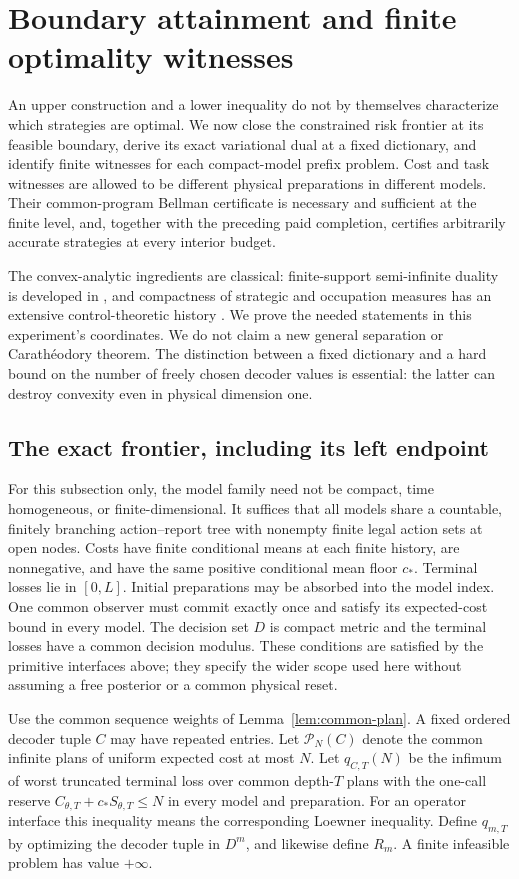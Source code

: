 \section{Boundary attainment and finite optimality witnesses}\label{sec:primal-dual}
An upper construction and a lower inequality do not by themselves characterize which strategies are optimal. We now close the constrained risk frontier at its feasible boundary, derive its exact variational dual at a fixed dictionary, and identify finite witnesses for each compact-model prefix problem. Cost and task witnesses are allowed to be different physical preparations in different models. Their common-program Bellman certificate is necessary and sufficient at the finite level, and, together with the preceding paid completion, certifies arbitrarily accurate strategies at every interior budget.

The convex-analytic ingredients are classical: finite-support semi-infinite duality is developed in \cite{Charnes63,Shapiro09}, and compactness of strategic and occupation measures has an extensive control-theoretic history \cite{Balder89,Dufour25}. We prove the needed statements in this experiment's coordinates. We do not claim a new general separation or Carath\'eodory theorem. The distinction between a fixed dictionary and a hard bound on the number of freely chosen decoder values is essential: the latter can destroy convexity even in physical dimension one.

\subsection{The exact frontier, including its left endpoint}
For this subsection only, the model family need not be compact, time homogeneous, or finite-dimensional. It suffices that all models share a countable, finitely branching action--report tree with nonempty finite legal action sets at open nodes. Costs have finite conditional means at each finite history, are nonnegative, and have the same positive conditional mean floor $c_*$. Terminal losses lie in $[0,L]$. Initial preparations may be absorbed into the model index. One common observer must commit exactly once and satisfy its expected-cost bound in every model. The decision set $D$ is compact metric and the terminal losses have a common decision modulus. These conditions are satisfied by the primitive interfaces above; they specify the wider scope used here without assuming a free posterior or a common physical reset.

Use the common sequence weights of Lemma~\ref{lem:common-plan}. A fixed ordered decoder tuple $C$ may have repeated entries. Let $\mathcal P_N(C)$ denote the common infinite plans of uniform expected cost at most $N$. Let $q_{C,T}(N)$ be the infimum of worst truncated terminal loss over common depth-$T$ plans with the one-call reserve $C_{\theta,T}+c_*S_{\theta,T}\le N$ in every model and preparation. For an operator interface this inequality means the corresponding Loewner inequality. Define $q_{m,T}$ by optimizing the decoder tuple in $D^m$, and likewise define $R_m$. A finite infeasible problem has value $+\infty$.


